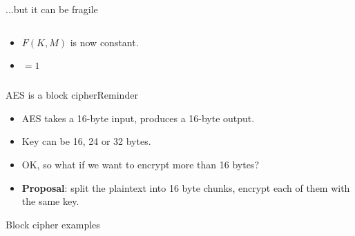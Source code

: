 \documentclass[aspectratio=169, lualatex, handout]{beamer}
\begin{document}
\begin{frame}{...but it can be fragile}
	\begin{columns}[c]
		\begin{column}{0.5\textwidth}
			\begin{itemize}
				\item $F(K, M)$ is now constant.
				\item {} $ = 1$
			\end{itemize}
		\end{column}
		\begin{column}{0.5\textwidth}
		\end{column}
	\end{columns}
\end{frame}

\begin{frame}{AES is a block cipher}{Reminder}
	\begin{itemize}[<+->]
		\item AES takes a 16-byte input, produces a 16-byte output.
		\item Key can be 16, 24 or 32 bytes. \pause
		\item OK, so what if we want to encrypt more than 16 bytes? \pause
		\item \textbf{Proposal}: split the plaintext into 16 byte chunks, encrypt
		      each of them with the same key.
	\end{itemize}
\end{frame}

\begin{frame}{Block cipher examples}
	\begin{columns}
		\begin{column}{0.33\textwidth}
		\end{column}
		\pause
		\begin{column}{0.33\textwidth}
		\end{column}
		\pause
		\begin{column}{0.33\textwidth}
		\end{column}
	\end{columns}
\end{frame}
\end{document}
